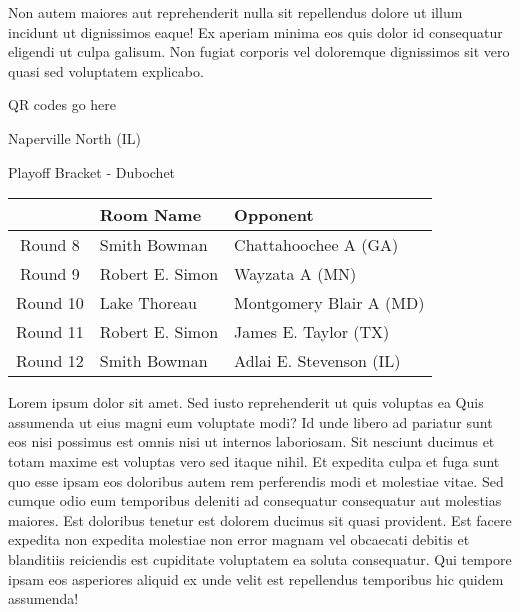 \documentclass{article}%
\begin{document}
\newline%
Non autem maiores aut reprehenderit nulla sit repellendus dolore ut illum incidunt ut dignissimos eaque! Ex aperiam minima eos quis dolor id consequatur eligendi ut culpa galisum. Non fugiat corporis vel doloremque dignissimos sit vero quasi sed voluptatem explicabo.\newline%
\newline%
%
\vspace*{30pt}%
\begin{center}%
\begin{Huge}%
QR codes go here%
\end{Huge}%
\end{center}%
\newpage%
\begin{center}%
\begin{Huge}%
Naperville North (IL)%
\end{Huge}%
\vspace*{8pt}%
\linebreak%
\begin{Large}%
Playoff Bracket {-} Dubochet%
\end{Large}%
\end{center}%
\begin{tabularx}{\textwidth}{|c|Y|Y|}%
\hline%
&Room Name&Opponent\\%
\hline%
Round 8&Smith Bowman&Chattahoochee A (GA)\\%
Round 9&Robert E. Simon&Wayzata A (MN)\\%
Round 10&Lake Thoreau&Montgomery Blair A (MD)\\%
Round 11&Robert E. Simon&James E. Taylor (TX)\\%
Round 12&Smith Bowman&Adlai E. Stevenson (IL)\\%
\hline%
\end{tabularx}%
\vspace*{8pt}%
\linebreak%
\newline%
\newline%
Lorem ipsum dolor sit amet. Sed iusto reprehenderit ut quis voluptas ea Quis assumenda ut eius magni eum voluptate modi? Id unde libero ad pariatur sunt eos nisi possimus est omnis nisi ut internos laboriosam. Sit nesciunt ducimus et totam maxime est voluptas vero sed itaque nihil. Et expedita culpa et fuga sunt quo esse ipsam eos doloribus autem rem perferendis modi et molestiae vitae.\newline%
\newline%
Sed cumque odio eum temporibus deleniti ad consequatur consequatur aut molestias maiores. Est doloribus tenetur est dolorem ducimus sit quasi provident. Est facere expedita non expedita molestiae non error magnam vel obcaecati debitis et blanditiis reiciendis est cupiditate voluptatem ea soluta consequatur. Qui tempore ipsam eos asperiores aliquid ex unde velit est repellendus temporibus hic quidem assumenda!\newline%
\end{document}
